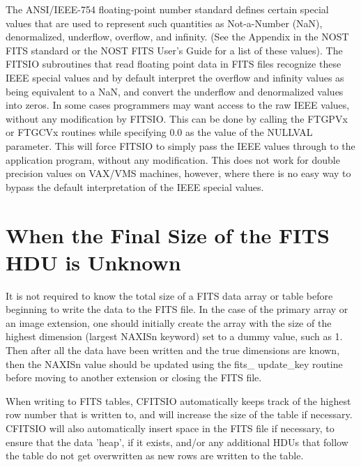 \documentclass[11pt]{book}
\begin{document}
The ANSI/IEEE-754 floating-point number standard defines certain
special values that are used to represent such quantities as
Not-a-Number (NaN), denormalized, underflow, overflow, and infinity.
(See the Appendix in the NOST FITS standard or the NOST FITS User's
Guide for a list of these values).  The FITSIO subroutines that read
floating point data in FITS files recognize these IEEE special values
and by default interpret the overflow and infinity values as being
equivalent to a NaN, and convert the underflow and denormalized values
into zeros.  In some cases programmers may want access to the raw IEEE
values, without any modification by FITSIO.  This can be done by
calling the FTGPVx or FTGCVx routines while specifying 0.0 as the value
of the NULLVAL parameter.  This will force FITSIO to simply pass the
IEEE values through to the application program, without any
modification.  This does not work for double precision values on
VAX/VMS machines, however, where there is no easy way to bypass the
default interpretation of the IEEE special values.


\section{When the Final Size of the FITS HDU is Unknown}

It is not required to know the total size of a FITS data array or table
before beginning to write the data to the FITS file.  In the case of
the primary array or an image extension, one should initially create
the array with the size of the highest dimension (largest NAXISn
keyword) set to a dummy value, such as 1.  Then after all the data have
been written and the true dimensions are known, then the NAXISn value
should be updated using the fits\_ update\_key routine before moving to
another extension or closing the FITS file.

When writing to FITS tables, CFITSIO automatically keeps track of the
highest row number that is written to, and will increase the size of
the table if necessary.  CFITSIO will also automatically insert space
in the FITS file if necessary, to ensure that the data 'heap', if it
exists, and/or any additional HDUs that follow the table do not get
overwritten as new rows are written to the table.
\end{document}
